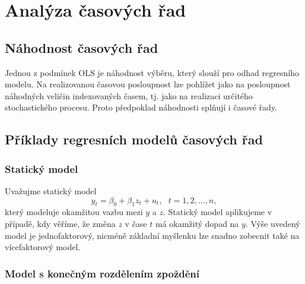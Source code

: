 \chapter{Analýza časových řad}

\section{Náhodnost časových řad}

Jednou z podmínek OLS je náhodnost výběru, který slouží pro 
odhad regresního modelu. Na realizovanou časovou posloupnost lze pohlížet jako na posloupnost 
náhodných veličin indexovaných časem, tj. jako na realizaci 
určitého stochastického procesu. Proto předpoklad náhodnosti splňují i časové řady.

\section{Příklady regresních modelů časových řad}

\subsection{Statický model}

Uvažujme statický model
\begin{equation}
	y_t = \beta_0 + \beta_1 z_t + u_t, ~~~ t = 1, 2, ..., n,
\end{equation}
který modeluje okamžitou vazbu mezi $y$ a $z$. Statický model 
aplikujeme v případě, kdy věříme, že změna $z$ v čase $t$ má 
okamžitý dopad na $y$. Výše uvedený model je jednofaktorový, 
nicméně základní myšlenku lze snadno zobecnit také na 
vícefaktorový model.

\subsection{Model s konečným rozdělením zpoždění}

